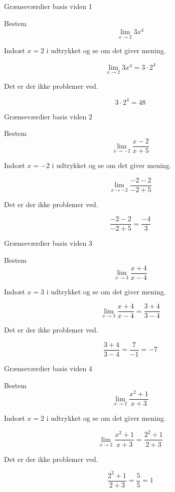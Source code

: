 \documentclass{article}
\begin{document}
\tableofcontents
\newpage

\begin{exercise}{Grænseværdier basis viden 1}

Bestem \[\lim_{x \to 2} 3x^4\]



\hint
Indsæt $x=2$ i udtrykket og se om det giver mening.

\hint
\[
\lim_{x \to 2} 3x^4 = 3 \cdot 2^4
\]

\hint
Det er der ikke problemer ved.

\hint
\[
3 \cdot 2^4 = 48
\]

\end{exercise}

\newpage
\begin{exercise}{Grænseværdier basis viden 2}

Bestem \[\lim_{x \to -2} \frac{x - 2}{x + 5}\]



\hint
Indsæt $x=-2$ i udtrykket og se om det giver mening.

\hint
\[
\lim_{x \to -2} \frac{-2 - 2}{-2 + 5}
\]

\hint
Det er der ikke problemer ved.

\hint
\[
\frac{-2 - 2}{-2 + 5} = \frac{-4}{3}
\]

\end{exercise}

\newpage
\begin{exercise}{Grænseværdier basis viden 3}

Bestem \[\lim_{x \to 3} \frac{x + 4}{x - 4}\]



\hint
Indsæt $x=3$ i udtrykket og se om det giver mening.

\hint
\[
\lim_{x \to 3} \frac{x + 4}{x - 4} = \frac{3 + 4}{3 - 4}
\]

\hint
Det er der ikke problemer ved.

\hint
\[
\frac{3 + 4}{3 - 4} = \frac{7}{-1} = -7
\]

\end{exercise}

\newpage
\begin{exercise}{Grænseværdier basis viden 4}

Bestem \[\lim_{x \to 2} \frac{x^2 + 1}{x + 3}\]



\hint
Indsæt $x=2$ i udtrykket og se om det giver mening.

\hint
\[
\lim_{x \to 2} \frac{x^2 + 1}{x + 3} = \frac{2^2 + 1}{2 + 3}
\]

\hint
Det er der ikke problemer ved.

\hint
\[
\frac{2^2 + 1}{2 + 3} = \frac{5}{5} = 1
\]

\end{exercise}
\end{document}
